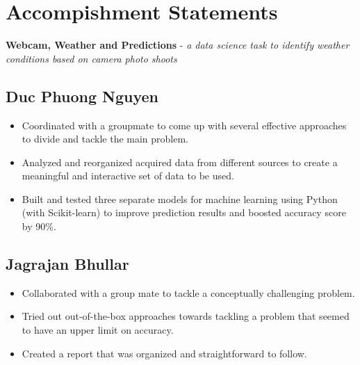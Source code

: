\newpage

\section{Accompishment Statements}

\textbf{Webcam, Weather and Predictions} - \textit{a data science task to identify weather conditions based on camera photo shoots}

\subsection{Duc Phuong Nguyen}

\begin{itemize}
\item Coordinated with a groupmate to come up with several effective approaches to divide and tackle the main problem.
\item Analyzed and reorganized acquired data from different sources to create a meaningful and interactive set of data to be used.
\item Built and tested three separate models for machine learning using Python (with Scikit-learn) to improve prediction results and boosted accuracy score by 90\%.
\end{itemize}

\subsection{Jagrajan Bhullar}

\begin{itemize}
	\item Collaborated with a group mate to tackle a conceptually challenging problem.
	\item Tried out out-of-the-box approaches towards tackling a problem that seemed to have an upper limit on accuracy.
	\item Created a report that was organized and straightforward to follow.
\end{itemize}


